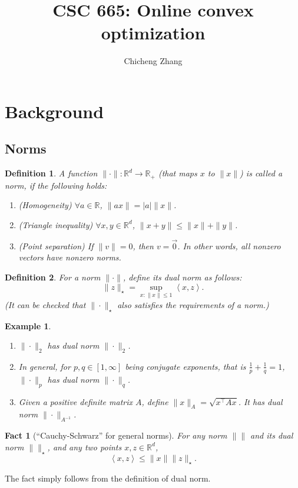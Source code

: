 \documentclass{article}
\title{CSC 665: Online convex optimization}
\author{Chicheng Zhang}
\newtheorem{example}{Example}
\newtheorem{definition}{Definition}
\newtheorem{fact}{Fact}
\newcommand{\RR}{\mathbb{R}} %
\newcommand{\inner}[2]{\left\langle #1,#2 \right\rangle}
\begin{document}
\maketitle

\section{Background}

\subsection{Norms}
\begin{definition}
A function $\| \cdot \|: \RR^d \to \RR_+$ (that maps $x$ to $\|x\|$) is called a norm, if the following holds:
\begin{enumerate}
\item(Homogeneity) $\forall a \in \RR$, $\| ax \| = |a| \| x \|$.
\item(Triangle inequality) $\forall x, y \in \RR^d$, $\| x + y \| \leq \| x \| + \|y\|$.
\item(Point separation) If $\| v \| = 0$, then $v = \vec{0}$. In other words, all nonzero vectors have nonzero norms.
\end{enumerate}
\end{definition}

\begin{definition}
For a norm $\| \cdot \|$, define its dual norm as follows:
\[ \| z \|_\star = \sup_{x: \| x \| \leq 1} \inner{x}{z}. \]
(It can be checked that $\| \cdot \|_\star$ also satisfies the requirements of a norm.)
\end{definition}

\begin{example}
\begin{enumerate}
  \item $\| \cdot \|_2$ has dual norm $\| \cdot \|_2$.
  \item In general, for $p, q \in [1,\infty]$ being conjugate exponents, that is $\frac1p + \frac1q = 1$, $\| \cdot\|_p$ has dual norm $\| \cdot \|_q$.
  \item Given a positive definite matrix $A$, define $\| x \|_A = \sqrt{x^\top A x}$. It has dual norm $\| \cdot \|_{A^{-1}}$.
\end{enumerate}
\end{example}

\begin{fact}[``Cauchy-Schwarz'' for general norms]
For any norm $\| \|$ and its dual norm $\| \|_\star$, and any two points
$x, z \in \RR^d$,
\[ \inner{x}{z} \leq \| x \| \| z \|_\star. \]
\end{fact}
The fact simply follows from the definition of dual norm.
\end{document}
